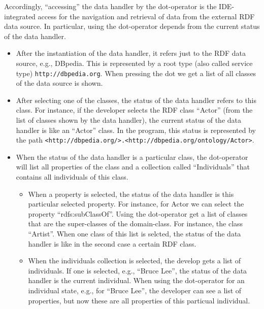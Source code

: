\documentclass{llncs} %
\begin{document}
Accordingly, ``accessing'' the data handler by the dot-operator is the IDE-integrated
access for the navigation and retrieval of data from the external RDF data source.
In particular, using the dot-operator depends from the current status of
the data handler. 

\begin{itemize}
	\item After the instantiation of the data handler, it refers just
	       to the RDF data source, e.g., DBpedia. This is represented
	   by a root type (also called service type) \texttt{http://dbpedia.org}.
		  When pressing the dot we get a list of all  classes of the data source is shown.
	\item After selecting one of the classes, the status of the data handler refers to this class.
	    For instance, if the developer selects the RDF class ``Actor'' (from the list of classes shown by the data handler),
			the current status of the data handler is like an ``Actor'' class. In the program,
			this status is represented by the path \texttt{<http://dbpedia.org/>.<http://dbpedia.org/ontology/Actor>}.
  \item When the status of the data handler is a particular class,
		the dot-operator will list all properties of the class and a collection
		called ``Individuals'' that contains all individuals of this class.
		 \begin{itemize}
			 \item When a property is selected, the status of the data handler is this
			   particular selected property. For instance, for Actor we can select the
				  property ``rdfs:subClassOf''. Using the dot-operator get a list of classes
					 that are the super-classes of the domain-class. For instance, the class ``Artist''.
					 When one class of this list is selcted, the status of the data handler is
					 like in the second case a certain RDF class.
				\item When the individuals collection is selected, the develop gets
					a list of individuals. If one is selected, e.g., ``Bruce Lee'', the
					status of the data handler is the current individual.
					When using the dot-operator for an individual state,
					 e.g., for ``Bruce Lee'', the developer can see a list of properties,
					but now these are all properties of this particual individual.
		 \end{itemize}
\end{itemize}


\end{document}
